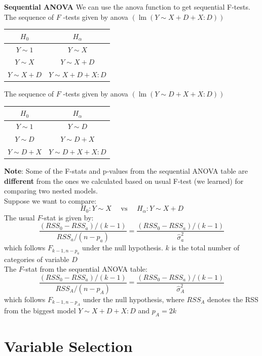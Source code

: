 \documentclass[11pt,a4paper]{article}
\begin{document}
\textbf{Sequential ANOVA}
We can use the anova function to get sequential F-tests. The sequence of $F$ -tests given by anova $(\operatorname{lm}(Y \sim X+D+X: D))$
\begin{center}
    \begin{tabular}{|c|c|}
        \hline$H_{0}$ & $H_{\alpha}$ \\
        \hline \hline$Y \sim 1$ & $Y \sim X$ \\
        $Y \sim X$ & $Y \sim X+D$ \\
        $Y \sim X+D$ & $Y \sim X+D+X: D$ \\
        \hline
        \end{tabular}
\end{center}
The sequence of $F$ -tests given by anova $(\operatorname{lm}(Y \sim D+X+X: D))$
\begin{center}
\begin{tabular}{|c|c|}
\hline$H_{0}$ & $H_{\alpha}$ \\
\hline \hline$Y \sim 1$ & $Y \sim D$ \\
$Y \sim D$ & $Y \sim D+X$ \\
$Y \sim D+X$ & $Y \sim D+X+X: D$ \\
\hline
\end{tabular}
\end{center}
\textbf{Note}: Some of the F-stats and p-values from the sequential ANOVA table are \textbf{diﬀerent} from the ones we calculated based on usual F-test (we learned) for comparing two nested models.\\
Suppose we want to compare:
$$
H_{0}: Y \sim X \quad \text { vs } \quad H_{\alpha}: Y \sim X+D
$$
The usual $F$-stat is given by:
$$
\frac{\left(R S S_{0}-R S S_{a}\right) /(k-1)}{R S S_{a} /\left(n-p_{a}\right)}=\frac{\left(R S S_{0}-R S S_{a}\right) /(k-1)}{\hat{\sigma}_{a}^{2}}
$$
which follows $F_{k-1, n-p_{a}}$ under the null hypothesis. $k$ is the total number of categories of variable $D$\\
The $F$-stat from the sequential ANOVA table:
$$
\frac{\left(R S S_{0}-R S S_{a}\right) /(k-1)}{R S S_{A} /\left(n-p_{A}\right)}=\frac{\left(R S S_{0}-R S S_{a}\right) /(k-1)}{\hat{\sigma}_{A}^{2}}
$$
which follows $F_{k-1, n-p_{A}}$ under the null hypothesis, where $R S S_{A}$ denotes the RSS from the biggest model $Y \sim X+D+X: D$ and $p_{A}=2 k$


\section{Variable Selection}
\end{document}
